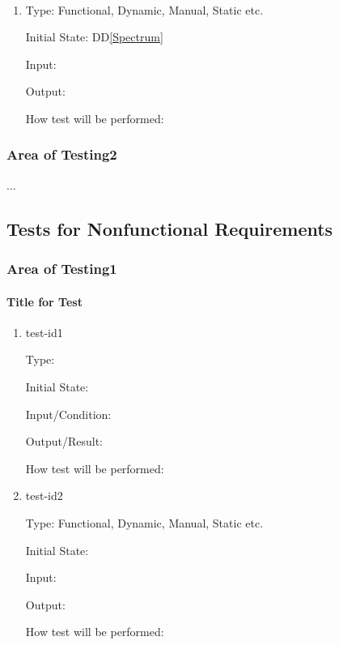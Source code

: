 \documentclass[12pt, titlepage]{article}
\newcommand{\ddref}[1]{DD\ref{#1}}
\begin{document}
\paragraph{}

\begin{enumerate}

\item{}

Type: Functional, Dynamic, Manual, Static etc.
					
Initial State: \ddref{Spectrum}
					
Input: 
					
Output: 
					
How test will be performed: 



\end{enumerate}


\subsubsection{Area of Testing2}

...

\subsection{Tests for Nonfunctional Requirements}

\subsubsection{Area of Testing1}
		
\paragraph{Title for Test}

\begin{enumerate}

\item{test-id1\\}

Type: 
					
Initial State: 
					
Input/Condition: 
					
Output/Result: 
					
How test will be performed: 
					
\item{test-id2\\}

Type: Functional, Dynamic, Manual, Static etc.
					
Initial State: 
					
Input: 
					
Output: 
					
How test will be performed: 

\end{enumerate}
\end{document}
